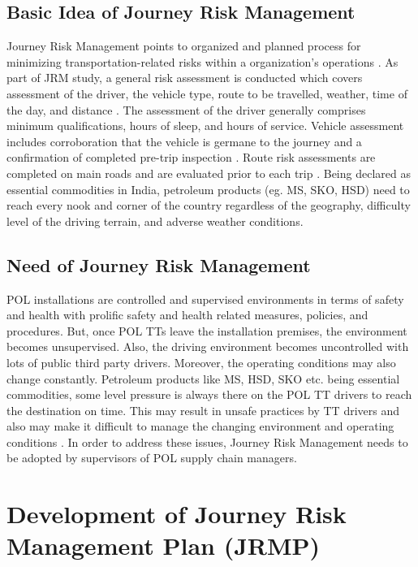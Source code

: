 \documentclass[paper=letter, fontsize=12pt]{article}
\begin{document}
\subsection{Basic Idea of Journey Risk Management}
Journey Risk Management points to organized and planned process for minimizing transportation-related risks within a organization's operations \cite{retzer1}. As part of JRM study, a general risk assessment is conducted which covers assessment of the driver, the vehicle type, route to be travelled, weather, time of the day, and distance \cite{retzer2}.
The assessment of the driver generally comprises minimum qualifications, hours of sleep, and hours of service. Vehicle assessment includes corroboration that the vehicle is germane to the journey and a confirmation of completed pre-trip inspection \cite{retzer2}. Route risk assessments are completed on main roads and are evaluated prior to each trip \cite{retzer2}. Being declared as essential commodities in India, petroleum products (eg. MS, SKO, HSD) need to reach every nook and corner of the country regardless of the geography, difficulty level of the driving terrain, and adverse weather conditions.

\subsection{Need of Journey Risk Management}

POL installations are controlled and supervised environments in terms of safety and health with prolific safety and health related measures, policies, and procedures. But, once POL TTs leave the installation premises, the environment becomes unsupervised. Also, the driving environment becomes uncontrolled with lots of public third party drivers. Moreover, the operating conditions may also change constantly. Petroleum products like MS, HSD, SKO etc. being essential commodities, some level pressure is always there on the POL TT drivers to reach the destination on  time. This may result in unsafe practices by TT drivers and also may make it difficult to manage the changing environment and operating conditions \cite{retzer1}. In order to address these issues, Journey Risk Management needs to be adopted by supervisors of POL supply chain managers.



\section{Development of Journey Risk Management Plan (JRMP)}
\end{document}
